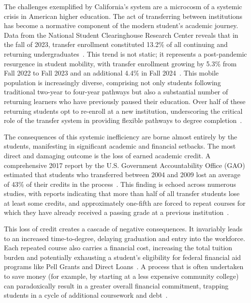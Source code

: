 \begin{introduction}
The challenges exemplified by California's system are a microcosm of a systemic crisis in American higher education. The act of transferring between institutions has become a normative component of the modern student's academic journey. Data from the National Student Clearinghouse Research Center reveals that in the fall of 2023, transfer enrollment constituted 13.2\% of all continuing and returning undergraduates~\cite{nscnews2023}. This trend is not static; it represents a post-pandemic resurgence in student mobility, with transfer enrollment growing by 5.3\% from Fall 2022 to Fall 2023 and an additional 4.4\% in Fall 2024~\cite{nscnews2023,nscnews20250305}. This mobile population is increasingly diverse, comprising not only students following traditional two-year to four-year pathways but also a substantial number of returning learners who have previously paused their education. Over half of these returning students opt to re-enroll at a new institution, underscoring the critical role of the transfer system in providing flexible pathways to degree completion~\cite{nscdd20250507}.

The consequences of this systemic inefficiency are borne almost entirely by the students, manifesting in significant academic and financial setbacks. The most direct and damaging outcome is the loss of earned academic credit. A comprehensive 2017 report by the U.S. Government Accountability Office (GAO) estimated that students who transferred between 2004 and 2009 lost an average of 43\% of their credits in the process~\cite{gao2017}. This finding is echoed across numerous studies, with reports indicating that more than half of all transfer students lose at least some credits, and approximately one-fifth are forced to repeat courses for which they have already received a passing grade at a previous institution~\cite{publicagenda2025}.

This loss of credit creates a cascade of negative consequences. It invariably leads to an increased time-to-degree, delaying graduation and entry into the workforce. Each repeated course also carries a financial cost, increasing the total tuition burden and potentially exhausting a student's eligibility for federal financial aid programs like Pell Grants and Direct Loans~\cite{gao2017}. A process that is often undertaken to save money (for example, by starting at a less expensive community college) can paradoxically result in a greater overall financial commitment, trapping students in a cycle of additional coursework and debt~\cite{collegeopportunity2017}.


\end{introduction}
